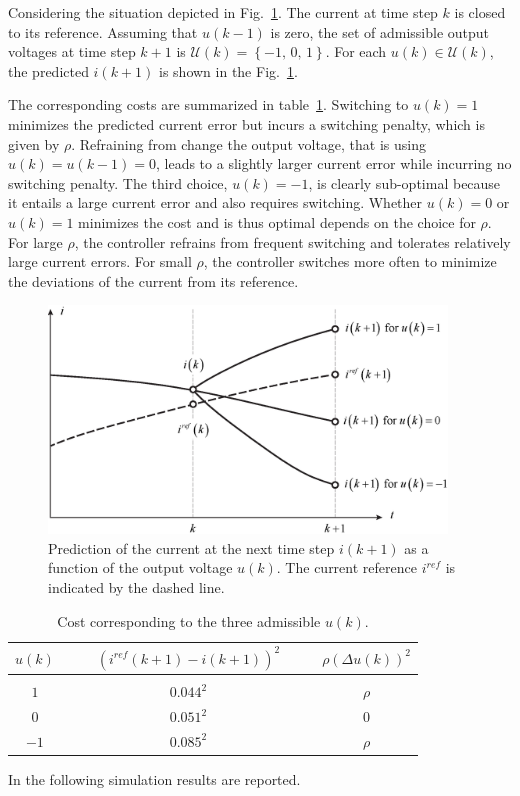 \documentclass[11pt,a4paper,oneside]{book}
\numberwithin{equation}{section}
\theoremstyle{it}
\theoremstyle{definition}
\begin{document}
Considering the situation depicted in Fig.~\ref{fig:current_ctrl}. The current 
at time step $k$ is closed to its reference. Assuming that $u(k-1)$ is zero, 
the set of admissible output voltages at time step $k+1$ is $\mathcal{U}(k) = 
\left\lbrace-1,\,0,\,1 \right\rbrace $. For each $u(k)\in\mathcal{U}(k)$, the 
predicted $i(k+1)$ is shown in the Fig.~\ref{fig:current_ctrl}.

The corresponding costs are summarized in table~\ref{tepm2}. Switching to 
$u(k)=1$ minimizes the predicted current error but incurs a switching penalty, 
which is given by $\rho$. Refraining from change the output voltage, that is 
using $u(k)=u(k-1)=0$, leads to a slightly larger current error while incurring 
no switching penalty. The third choice, $u(k)=-1$, is clearly sub-optimal 
because it entails a large current error and also requires switching. Whether 
$u(k)=0$ or $u(k)=1$ minimizes the cost and is thus optimal depends on the 
choice for $\rho$. For large $\rho$, the controller refrains from frequent 
switching and tolerates relatively large current errors. For small $\rho$, the 
controller switches more often to minimize the deviations of the current from 
its reference.
\begin{figure}[H]
	\centering
	\includegraphics[width = 300pt, 
	keepaspectratio]{figures/mpc/rl_mpc_1.eps}
	\captionsetup{width=.5\textwidth}
	\caption{Prediction of the current at the next time step $i(k+1)$ as a 
	function of the output voltage $u(k)$. The current reference $i^{ref}$ is 
	indicated by the dashed line.}
	\label{fig:current_ctrl}
\end{figure}
\begin{table}[H]
	\begin{center}
		\begin{tabular}{c|c|c}
			$u(k)\quad$ & $\quad \left(i^{ref}(k+1)-i(k+1) \right)^2 \quad$ & 
			$\quad \rho\left( \Delta u(k)\right) ^2$ \\[6pt]
			\hline\hline & & \\
			$1\quad$ 	& $\quad 0.044^2 \quad$ & $\quad \rho$ \\[6pt] 
			$0\quad$ 	& $\quad 0.051^2\quad$ & $\quad 0$ \\[6pt]
			$-1\quad$ 	& $\quad 0.085^2 \quad$ & $\quad \rho$ \\
		\end{tabular}
	\end{center}
	\captionsetup{width=.5\textwidth}
	\caption{Cost corresponding to the three admissible $u(k)$.}
	\label{tepm2}
\end{table}
In the following simulation results are reported.
\end{document}
